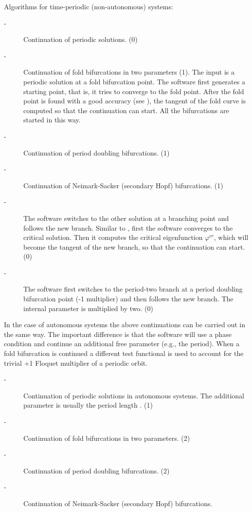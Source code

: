 \documentclass[10pt,a4paper]{ddedoc}
\begin{document}
\begin{description}
Algorithms for time-periodic (non-autonomous) systems:
\begin{description}
\item[ -] Continuation of periodic solutions. (0)
%
\item[ -] Continuation of fold bifurcations in two parameters (1). The
input is a periodic solution at a fold bifurcation point. The software first
generates a starting point, that is, it tries to converge to the fold point. After the fold point is found with a good accuracy (see
), the tangent of the fold curve is computed so that the continuation
can start. All the bifurcations are started in this way.
%
\item[ -] Continuation of period doubling bifurcations. (1)
%
\item[ -] Continuation of Neimark-Sacker (secondary Hopf) bifurcations.
(1)
%
\item[ -] The software switches to the other solution at a branching point and
follows the new branch. Similar to , first the software converges to
the critical solution. Then it computes the critical eigenfunction
$\varphi^{cr}$, which will become the tangent of the new branch, so that the
continuation can start. (0)
%
\item[ -] The software first switches to the period-two branch at a
period doubling bifurcation point
(-1 multiplier) and then follows the new branch. The internal parameter  is multiplied by two. (0)
\end{description}
In the case of autonomous systems the above continuations can be carried out in
the same way. The important difference is that the software will use a phase
condition and continue an additional free parameter (e.g., the period). When a
fold bifurcation is continued a different test functional is used to account for
the trivial +1 Floquet multiplier of a periodic orbit.
\begin{description}
\item[ -] Continuation of periodic solutions in autonomous systems. The
additional parameter is usually the period length . (1)
%
\item[ -] Continuation of fold bifurcations in two parameters. (2)
%
\item[ -] Continuation of period doubling bifurcations. (2)
%
\item[ -] Continuation of Neimark-Sacker (secondary Hopf) bifurcations.

\end{description}
\end{description}
\end{document}
